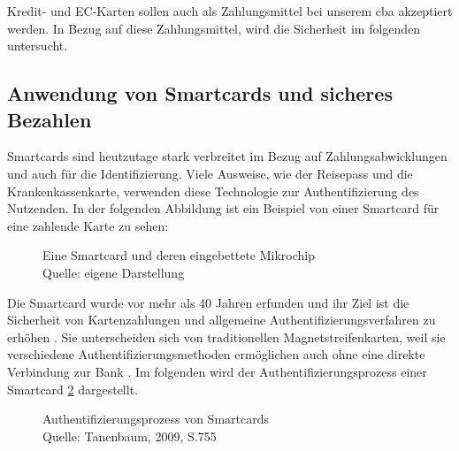 Kredit- und EC-Karten sollen auch als Zahlungsmittel bei unserem \acrshort{cba} akzeptiert werden. 
In Bezug auf diese Zahlungsmittel, wird die Sicherheit im folgenden untersucht.

\subsection{Anwendung von Smartcards und sicheres Bezahlen}
Smartcards sind heutzutage stark verbreitet im Bezug auf Zahlungsabwicklungen und auch für die Identifizierung.
Viele Ausweise, wie der Reisepass und die Krankenkassenkarte, verwenden diese Technologie zur Authentifizierung
des Nutzenden. In der folgenden Abbildung ist ein Beispiel von einer Smartcard für eine zahlende Karte zu sehen: 

\begin{figure}[H]
   \caption{Eine Smartcard und deren eingebettete Mikrochip\\Quelle: eigene Darstellung}
   \label{fig:eigenes_Bild}
\end{figure}

Die Smartcard wurde vor mehr als 40 Jahren erfunden und ihr Ziel ist die Sicherheit von Kartenzahlungen und 
allgemeine Authentifizierungsverfahren zu erhöhen \cite{refip:JFSB}. Sie unterscheiden sich von traditionellen 
Magnetstreifenkarten, weil sie verschiedene Authentifizierungsmethoden ermöglichen auch ohne eine direkte 
Verbindung zur Bank \cite{refbook:ATMS}. Im folgenden wird der Authentifizierungsprozess einer Smartcard 
\ref{fig:refbook_ATMS} dargestellt. 

\begin{figure}[H]
   \caption{Authentifizierungsprozess von Smartcards\\Quelle: Tanenbaum, 2009, S.755}
   \label{fig:refbook_ATMS}
\end{figure}

